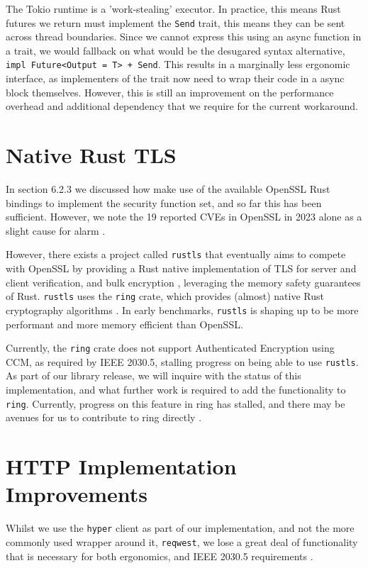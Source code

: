 The Tokio runtime is a 'work-stealing' executor. In practice, this means Rust futures we return must implement the \texttt{Send} trait, this means they can be sent across thread boundaries. Since we cannot express this using an async function in a trait, we would fallback on what would be the desugared syntax alternative, \texttt{impl Future<Output = T> + Send}. This results in a marginally less ergonomic interface, as implementers of the trait now need to wrap their code in a async block themselves. However, this is still an improvement on the performance overhead and additional dependency that we require for the current workaround.

\section{Native Rust TLS}
In section 6.2.3 we discussed how make use of the available OpenSSL Rust bindings to implement the security function set, and so far this has been sufficient. However, we note the 19 reported CVEs in OpenSSL in 2023 alone as a slight cause for alarm \cite{OpensslCVE}. 

However, there exists a project called \texttt{rustls} that eventually aims to compete with OpenSSL by providing a Rust native implementation of TLS for server and client verification, and bulk encryption \cite{rustls}, leveraging the memory safety guarantees of Rust. \texttt{rustls} uses the \texttt{ring} crate, which provides (almost) native Rust cryptography algorithms \cite{ring}. 
In early benchmarks, \texttt{rustls} is shaping up to be more performant and more memory efficient than OpenSSL. \cite{rustlsperf}

Currently, the \texttt{ring} crate does not support Authenticated Encryption using CCM, as required by IEEE 2030.5, stalling progress on being able to use \texttt{rustls}. As part of our library release, we will inquire with the status of this implementation, and what further work is required to add the functionality to \texttt{ring}. Currently, progress on this feature in ring has stalled, and there may be avenues for us to contribute to ring directly \cite{ringccmpr} \cite{ringccmissue}.

\section{HTTP Implementation Improvements}
Whilst we use the \texttt{hyper} client as part of our implementation, and not the more commonly used wrapper around it, \texttt{reqwest}, we lose a great deal of functionality that is necessary for both ergonomics, and IEEE 2030.5 requirements \cite{reqwest}. 

